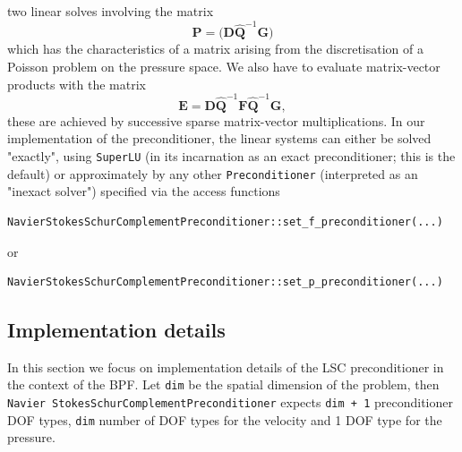 two linear solves involving the matrix
\begin{equation*}
{\mathbf P} = \big({\mathbf D} \widehat{\mathbf Q}^{-1}{\mathbf G} \big)
\end{equation*}
which has the characteristics of a matrix arising from the discretisation of a
Poisson problem on the pressure space. We also have to evaluate matrix-vector
products with the matrix 
\begin{equation*}
{\mathbf E}={\mathbf D}\widehat{\mathbf Q}^{-1}{\mathbf F}\widehat{\mathbf Q}^{-1}{\mathbf G},
\end{equation*}
these are achieved by successive sparse matrix-vector multiplications.
In our implementation of the preconditioner, the linear systems
can either be solved "exactly", using \texttt{SuperLU} (in its incarnation
as an exact preconditioner; this is the default) or approximately by any 
other \texttt{Preconditioner} (interpreted as an "inexact solver")
specified via the access functions
\begin{verbatim}
NavierStokesSchurComplementPreconditioner::set_f_preconditioner(...)
\end{verbatim}
or 
\begin{verbatim}
NavierStokesSchurComplementPreconditioner::set_p_preconditioner(...)
\end{verbatim}

\subsection{Implementation details\label{sec:lsc_implementation}}
In this section we focus on implementation details of the LSC preconditioner in the context of the BPF. Let \texttt{dim} be the
spatial dimension of the problem, then \texttt{Navier\allowbreak
  Stokes\allowbreak Schur\allowbreak Complement\allowbreak Preconditioner}
expects \texttt{dim + 1} preconditioner DOF types, \texttt{dim} number of DOF
types for the velocity and 1 DOF type for the pressure. 

